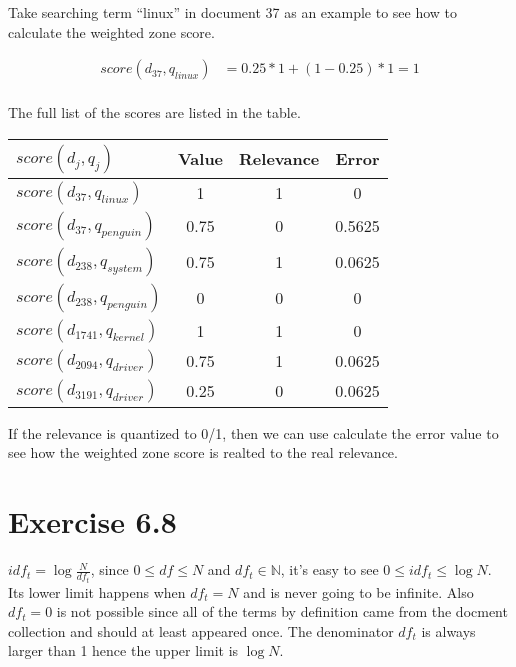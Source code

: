 \documentclass[11pt]{article} %
\begin{document}
Take searching term ``linux'' in document 37 as an example to see how to calculate the weighted zone score.

\begin{align*}
    score(d_{37}, q_{linux}) &= 0.25 * 1 + (1 - 0.25) * 1 = 1\\
\end{align*}

The full list of the scores are listed in the table.

\begin{table}[h]
    \begin{center}
        \begin{tabular}{l|c|c|c}
            \textbf{$score(d_j, q_j)$} & \textbf{Value} & \textbf{Relevance} & \textbf{Error}\\
            \hline
            $score(d_{37}, q_{linux})$ & 1 & 1 & 0\\
            $score(d_{37}, q_{penguin})$ & 0.75 & 0 & 0.5625\\
            $score(d_{238}, q_{system})$ & 0.75 & 1 & 0.0625\\
            $score(d_{238}, q_{penguin})$ & 0 & 0 & 0\\
            $score(d_{1741}, q_{kernel})$ & 1 & 1 & 0\\
            $score(d_{2094}, q_{driver})$ & 0.75 & 1 & 0.0625\\
            $score(d_{3191}, q_{driver})$ & 0.25 & 0 & 0.0625\\
        \end{tabular}
    \end{center}
\end{table}

If the relevance is quantized to 0/1, then we can use calculate the error value to see how the weighted zone score is realted to the real relevance.

\section*{Exercise 6.8}

$idf_t = \log{\frac{N}{df_t}}$, since $0 \leq df \leq N$ and $df_t \in \mathbb{N}$, it's easy to see $0 \leq idf_t \leq \log{N}$. Its lower limit happens when $df_t = N$ and is never going to be infinite. Also $df_t = 0$ is not possible since all of the terms by definition came from the docment collection and should at least appeared once. The denominator $df_t$ is always larger than 1 hence the upper limit is $\log{N}$.
\end{document}
